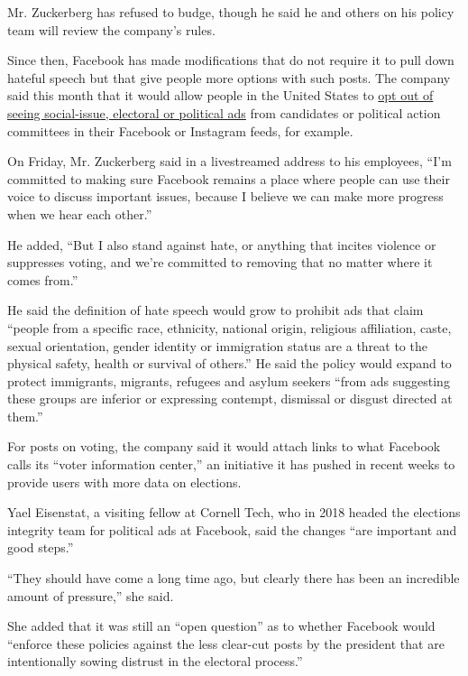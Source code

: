 Mr. Zuckerberg has refused to budge, though he said he and others on his
policy team will review the company's rules.

Since then, Facebook has made modifications that do not require it to
pull down hateful speech but that give people more options with such
posts. The company said this month that it would allow people in the
United States to
\href{https://www.nytimes.com/2020/06/16/technology/opt-out-political-ads-facebook.html}{opt
out of seeing social-issue, electoral or political ads} from candidates
or political action committees in their Facebook or Instagram feeds, for
example.

On Friday, Mr. Zuckerberg said in a livestreamed address to his
employees, ``I'm committed to making sure Facebook remains a place where
people can use their voice to discuss important issues, because I
believe we can make more progress when we hear each other.''

He added, ``But I also stand against hate, or anything that incites
violence or suppresses voting, and we're committed to removing that no
matter where it comes from.''

He said the definition of hate speech would grow to prohibit ads that
claim ``people from a specific race, ethnicity, national origin,
religious affiliation, caste, sexual orientation, gender identity or
immigration status are a threat to the physical safety, health or
survival of others.'' He said the policy would expand to protect
immigrants, migrants, refugees and asylum seekers ``from ads suggesting
these groups are inferior or expressing contempt, dismissal or disgust
directed at them.''

For posts on voting, the company said it would attach links to what
Facebook calls its ``voter information center,'' an initiative it has
pushed in recent weeks to provide users with more data on elections.

Yael Eisenstat, a visiting fellow at Cornell Tech, who in 2018 headed
the elections integrity team for political ads at Facebook, said the
changes ``are important and good steps.''

``They should have come a long time ago, but clearly there has been an
incredible amount of pressure,'' she said.

She added that it was still an ``open question'' as to whether Facebook
would ``enforce these policies against the less clear-cut posts by the
president that are intentionally sowing distrust in the electoral
process.''

